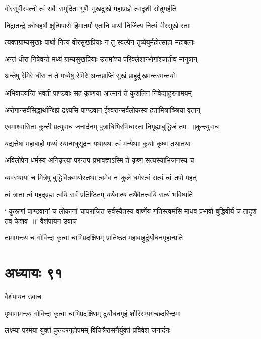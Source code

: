 \twolineshloka
{वीरसूर्वीरपत्नी त्वं सर्वैः समुदिता गुणैः}
{मुखदुःखे महाप्राज्ञे त्वादृशी सोढुमर्हति}


\twolineshloka
{निद्रातन्द्रे क्रोधहर्षौ क्षुत्पिपासे हिमातपौ}
{एतानि पार्था निर्जित्य नित्यं वीरसुखे रताः}


\twolineshloka
{त्यक्तग्राम्यसुखाः पार्था नित्यं वीरसुखप्रियाः}
{न तु स्वल्पेन तुष्येयुर्महोत्साहा महाबलाः}


\twolineshloka
{अन्तं धीरा निषेवन्ते मध्यं ग्राम्यसुखप्रियाः}
{उत्तमांश्च परिक्लेशान्भोगांश्चातीव मानुषान्}


\twolineshloka
{अन्तेषु रेमिरे धीरा न ते मध्येषु रेमिरे}
{अन्तप्राप्तिं सुखं प्राहुर्दुःखमन्तरमन्तयोः}


\twolineshloka
{अभिवादयन्ति भवतीं पाण्डवाः सह कृष्णया}
{आत्मानं ते कुशलिनं निवेद्याहुरनामयम्}


\twolineshloka
{अरोगान्सर्वसिद्धार्थान्क्षिप्रं द्रक्ष्यसि पाण्डवान्}
{ईश्वरान्सर्वलोकस्य हतामित्राञ्श्रिया वृतान्}


\threelineshloka
{एवमाश्वासिता कुन्ती प्रत्युवाच जनार्दनम्}
{पुत्राधिभिरभिध्वस्ता निगृह्याबुद्धिजं तमः ॥कुन्त्युवाच}
{}


\twolineshloka
{यद्यत्तेषां महाबाहो पथ्यं स्यान्मधुसूदन}
{यथायथा त्वं मन्येथाः कुर्याः कृष्ण तथातथा}


\twolineshloka
{अविलोपेन धर्मस्य अनिकृत्या परन्तप}
{प्रभावज्ञाऽस्मि ते कृष्ण सत्यस्याभिजनस्य च}


\twolineshloka
{व्यवस्थायां च मित्रेषु बुद्धिविक्रमयोस्तथा}
{त्वमेव नः कुले धर्मस्त्वं सत्यं त्वं तपो महत्}


\twolineshloka
{त्वं त्राता त्वं महद्ब्रह्म त्वयि सर्वं प्रतिष्ठितम्}
{यथैवात्थ तथैवैतत्त्वयि सत्यं भविष्यति}


\fourlineindentedshloka
{` कुरूणां पाण्डवानां च लोकानां चापराजित}
{सर्वस्यैतस्य वार्ष्णेय गतिस्त्वमसि माधव}
{प्रभावो बुद्धिवीर्यं च तादृशं तव केशव ॥' वैशंपायन उवाच}
{}


\twolineshloka
{तामामन्त्र्य च गोविन्दः कृत्वा चाभिप्रदक्षिणम्}
{प्रातिष्ठत महाबाहुर्दुर्योधनगृहान्प्रति}


\chapter{अध्यायः ९१}
\twolineshloka
{वैशंपायन उवाच}
{}


\twolineshloka
{पृथामामन्त्र्य गोविन्दः कृत्वा चाभिप्रदक्षिणम्}
{दुर्योधनगृहं शौरिरभ्यगच्छदरिन्दमः}


\twolineshloka
{लक्ष्म्या परमया युक्तं पुरन्दरगृहोपमम्}
{विचित्रैरासनैर्युक्तं प्रविवेश जनार्दनः}


